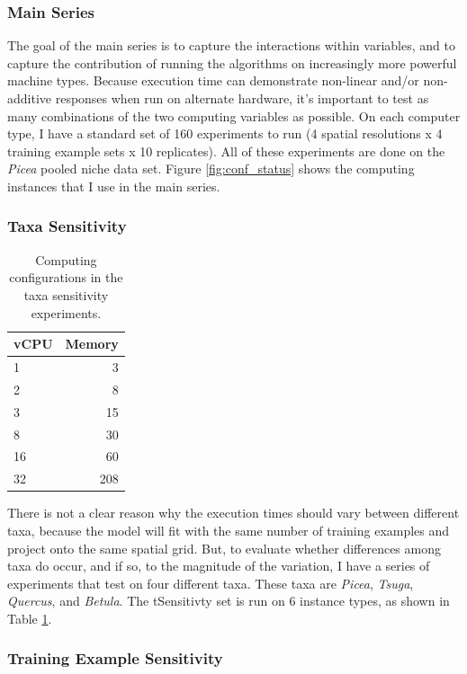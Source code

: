 \documentclass[a4paper]{article}
\begin{document}
\subsubsection{Main Series}
The goal of the main series is to capture the interactions within variables, and to capture the contribution of running the algorithms on increasingly more powerful machine types.  Because execution time can demonstrate non-linear and/or non-additive responses when run on alternate hardware, it's important to test as many combinations of the two computing variables as possible.  On each computer type, I have a standard set of 160 experiments to run (4 spatial resolutions x 4 training example sets x 10 replicates). All of these experiments are done on the \textit{Picea} pooled niche data set. Figure \ref{fig:conf_status} shows the computing instances that I use in the main series.

\subsubsection{Taxa Sensitivity}

\begin{table}
\centering
\begin{tabular}{l|r}
vCPU & Memory \\\hline
1 & 3 \\
2 & 8\\
3 & 15\\
8 & 30\\
16 & 60\\
32 & 208
\end{tabular}
\caption{Computing configurations in the taxa sensitivity experiments.}\label{tab:tSensitivity}
\end{table}

There is not a clear reason why the execution times should vary between different taxa, because the model will fit with the same number of training examples and project onto the same spatial grid.  But, to evaluate whether differences among taxa do occur, and if so, to the magnitude of the variation, I have a series of experiments that test on four different taxa.  These taxa are \textit{Picea}, \textit{Tsuga}, \textit{Quercus}, and \textit{Betula}.  The tSensitivty set is run on 6 instance types, as shown in Table \ref{tab:tSensitivity}.

\subsubsection{Training Example Sensitivity}
\end{document}
